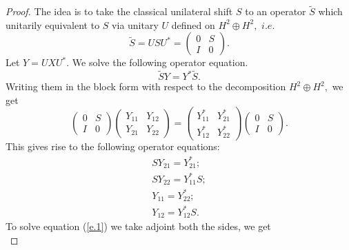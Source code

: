 \documentclass[12pt, reqno]{amsart}
\theoremstyle{definition}
\theoremstyle{remark}
\numberwithin{equation}{section}
\begin{document}
        \begin{proof}
        The idea is to take the classical unilateral shift $S$ to an operator $\tilde S$ which unitarily equivalent to $S$ via unitary $U$ defined on $H^2 \oplus H^2,$ $i.e.$
        \begin{equation*}
            \tilde S= USU^*=
            \begin{pmatrix}
                0&S\\
                I&0
            \end{pmatrix}.
        \end{equation*}
        Let $Y=UXU^*.$ We solve the following operator equation.
        \begin{equation}
            \tilde S Y=Y^*\tilde S.
        \end{equation}
        Writing them in the block form with respect to the decomposition $H^2 \oplus H^2,$ we get
        \begin{equation*}
            \begin{pmatrix}
                 0&S\\
                I&0
            \end{pmatrix}
            \begin{pmatrix}
                Y_{11}&Y_{12}\\
                Y_{21}&Y_{22}
            \end{pmatrix}
            =
             \begin{pmatrix}
                Y^*_{11}&Y^*_{21}\\
                Y^*_{12}&Y^*_{22}
            \end{pmatrix}
            \begin{pmatrix}
                 0&S\\
                I&0
            \end{pmatrix}.
        \end{equation*}
        This gives rise to the following operator equations:
        \begin{align}
            SY_{21}=Y^*_{21}; \label{e.1} \\
            SY_{22}=Y^*_{11}S;\label{e.2} \\
            Y_{11}=Y^*_{22};\label{e.3} \\
            Y_{12}=Y^*_{12}S. \label{e.4}
        \end{align}
        To solve equation (\ref{e.1}) we take adjoint both the sides, we get
        \begin{equation*}

\end{equation*}
\end{proof}
\end{document}

